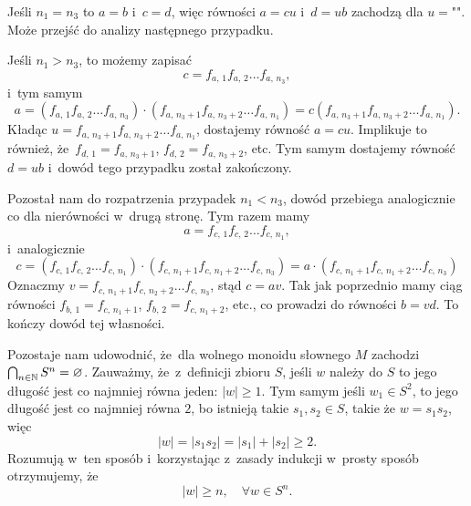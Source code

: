 \documentclass[a4paper,11pt]{article}
\begin{document}
Jeśli $n_{ 1 } = n_{ 3 }$ to $a = b$ i~$c = d$, więc równości $a = cu$
i~$d = ub$ zachodzą dla $u = \texttt{""}$. Może przejść do analizy
następnego przypadku.

Jeśli $n_{ 1 } > n_{ 3 }$, to możemy zapisać
\begin{equation}
  \label{eq:Forys-Forys-42}
  c = f_{ a,\, 1 } f_{ a,\, 2 } \ldots f_{ a,\, n_{ 3 } },
\end{equation}
i~tym samym
\begin{equation}
  \label{eq:Forys-Forys-43}
  a =
  ( f_{ a,\, 1 } f_{ a,\, 2 } \ldots f_{ a,\, n_{ 3 } } ) \cdot ( f_{ a,\, n_{ 3 } + 1 }
  f_{ a,\, n_{ 3 } + 2 } \ldots f_{ a,\, n_{ 1 } } )
  =
  c ( f_{ a,\, n_{ 3 } + 1 } f_{ a,\, n_{ 3 } + 2 } \ldots f_{ a,\, n_{ 1 } } ).
\end{equation}
Kładąc
$u = f_{ a,\, n_{ 3 } + 1 } f_{ a,\, n_{ 3 } + 2 } \ldots f_{ a,\, n_{ 1 }
}$, dostajemy równość $a = cu$. Implikuje to również,
że~$f_{ d,\, 1 } = f_{ a,\, n_{ 3 } + 1 }$,
$f_{ d,\, 2 } = f_{ a,\, n_{ 3 } + 2 }$, etc. Tym samym dostajemy
równość $d = ub$ i~dowód tego przypadku został zakończony.

Pozostał nam do rozpatrzenia przypadek $n_{ 1 } < n_{ 3 }$, dowód
przebiega analogicznie co dla nierówności w~drugą stronę. Tym razem
mamy
\begin{equation}
  \label{eq:Forys-Forys-44}
  a = f_{ c,\, 1 } f_{ c,\, 2 } \ldots f_{ c,\, n_{ 1 } },
\end{equation}
i~analogicznie
\begin{equation}
  \label{eq:Forys-Forys-45}
  c =
  ( f_{ c,\, 1 } f_{ c,\, 2 } \ldots f_{ c,\, n_{ 1 } })
  \cdot ( f_{ c,\, n_{ 1 } + 1 } f_{ c,\, n_{ 1 } + 2 } \ldots f_{ c,\, n_{ 3 } } )
  =
  a \cdot ( f_{ c,\, n_{ 1 } + 1 } f_{ c,\, n_{ 1 } + 2 } \ldots f_{ c,\, n_{ 3 } } )
\end{equation}
Oznaczmy
$v = f_{ c,\, n_{ 1 } + 1 } f_{ c,\, n_{ 2 } + 2 } \ldots f_{ c,\, n_{ 3 }
}$, stąd $c = a v$. Tak jak poprzednio mamy ciąg równości
$f_{ b,\, 1 } = f_{ c,\, n_{ 1 } + 1 }$,
$f_{ b,\, 2 } = f_{ c,\, n_{ 1 } + 2 }$, etc., co prowadzi do równości
$b = v d$. To kończy dowód tej własności.

Pozostaje nam udowodnić, że~dla wolnego monoidu słownego $M$ zachodzi
$\bigcap_{ n \in \mathbb{N} } S^{ n } = \varnothing$. Zauważmy, że~z~definicji
zbioru $S$, jeśli $w$ należy do $S$ to jego długość jest co najmniej
równa jeden: $| w | \geq 1$. Tym samym jeśli $w_{ 1 } \in S^{ 2 }$, to
jego długość jest co najmniej równa $2$, bo istnieją takie
$s_{ 1 }, s_{ 2 } \in S$, takie że $w = s_{ 1 } s_{ 2 }$, więc
\begin{equation}
  \label{eq:Forys-Forys-46}
  | w | = | s_{ 1 } s_{ 2 } | = | s_{ 1 } | + | s_{ 2 } | \geq 2.
\end{equation}
Rozumują w~ten sposób i~korzystając z~zasady indukcji w~prosty sposób
otrzymujemy, że
\begin{equation}
  \label{eq:Forys-Forys-47}
  | w | \geq n, \quad \forall w \in S^{ n }.
\end{equation}
\end{document}
